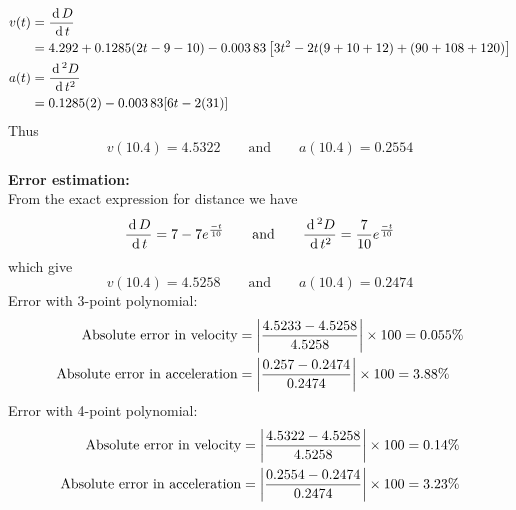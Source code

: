 \documentclass[12pt,class=book,crop=false]{standalone}
\begin{document}
\begin{soln}
\begin{enumerate}[label=(\alph*)]
\begin{align*}
                  v(t) & =\frac{\,\mathrm{d}\, D}{\,\mathrm{d}\, t}                                                                 \\
                       & =4.292+0.1285(2t-9-10)-0.003\,83\left[ 3t^2-2t(9+10+12)+(90+108+120) \right]         \\
                  a(t) & =\frac{\,\mathrm{d}\,^2 D}{\,\mathrm{d}\, t^2}                                                             \\
                       & =0.1285(2)-0.003\,83[6t-2(31)]
              \end{align*}
              Thus
              \[
                  v(10.4)=4.5322 \qquad\text{and}\qquad a(10.4)=0.2554
              \]
    \end{enumerate}
    \textbf{Error estimation:}\\
    From the exact expression for distance we have
    \[
        \frac{\,\mathrm{d}\, D}{\,\mathrm{d}\, t}=7-7e^{\frac{-t}{10}}\qquad \text{and}\qquad \frac{\,\mathrm{d}\,^2 D}{\,\mathrm{d}\, t^2}=\frac{7}{10} e^{\frac{-t}{10}}
    \]
    which give
    \[
        v(10.4)=4.5258 \qquad \text{and}\qquad a(10.4)=0.2474
    \]
    Error with 3-point polynomial:
    \begin{align*}
        \text{Absolute error in velocity}     & = \left\vert\frac{4.5233-4.5258}{4.5258}\right\vert\times 100=0.055\% \\
        \text{Absolute error in acceleration} & = \left\vert\frac{0.257-0.2474}{0.2474}\right\vert\times 100=3.88\%
    \end{align*}
    Error with 4-point polynomial:
    \begin{align*}
        \text{Absolute error in velocity}     & = \left\vert\frac{4.5322-4.5258}{4.5258}\right\vert\times 100=0.14\% \\
        \text{Absolute error in acceleration} & = \left\vert\frac{0.2554-0.2474}{0.2474}\right\vert\times 100=3.23\%
    \end{align*}
\end{soln}
\end{document}
